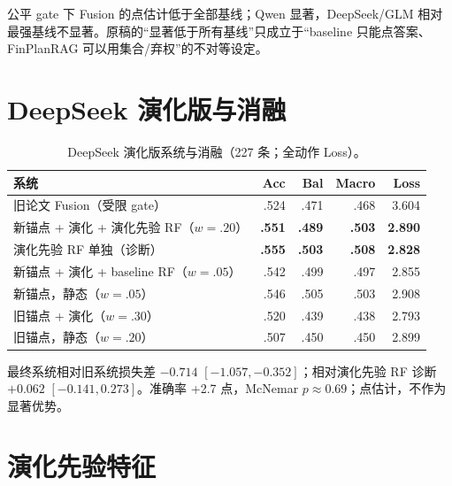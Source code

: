 \begin{revbox}
\noindent 公平 gate 下 Fusion 的点估计低于全部基线；Qwen 显著，DeepSeek/GLM 相对最强基线不显著。原稿的“显著低于所有基线”只成立于“baseline 只能点答案、FinPlanRAG 可以用集合/弃权”的不对等设定。
\end{revbox}

\section{DeepSeek 演化版与消融}

\begin{table}[H]
\centering
{}
\setlength{\tabcolsep}{2.5pt}
\caption{DeepSeek 演化版系统与消融（227 条；全动作 Loss）。}
\label{tab:g-evolution}
\begin{tabular}{lrrrr}
\toprule
系统 & Acc & Bal & Macro & Loss \\
\midrule
旧论文 Fusion（受限 gate） & .524 & .471 & .468 & 3.604 \\
\rowcolor{yellow!18} 新锚点 + 演化 + 演化先验 RF（$w=.20$） & \textbf{.551} & \textbf{.489} & \textbf{.503} & \textbf{2.890} \\
\rowcolor{yellow!18} 演化先验 RF 单独（诊断） & \textbf{.555} & \textbf{.503} & \textbf{.508} & \textbf{2.828} \\
\rowcolor{yellow!18} 新锚点 + 演化 + baseline RF（$w=.05$） & .542 & .499 & .497 & 2.855 \\
\rowcolor{yellow!18} 新锚点，静态（$w=.05$） & .546 & .505 & .503 & 2.908 \\
\rowcolor{yellow!18} 旧锚点 + 演化（$w=.30$） & .520 & .439 & .438 & 2.793 \\
\rowcolor{yellow!18} 旧锚点，静态（$w=.20$） & .507 & .450 & .450 & 2.899 \\
\bottomrule
\end{tabular}
\end{table}

\begin{revbox}
\noindent 最终系统相对旧系统损失差 $-0.714$ $[-1.057,-0.352]$；相对演化先验 RF 诊断 $+0.062$ $[-0.141,0.273]$。准确率 +2.7 点，McNemar $p\approx0.69$；点估计，不作为显著优势。
\end{revbox}

\section{演化先验特征}

